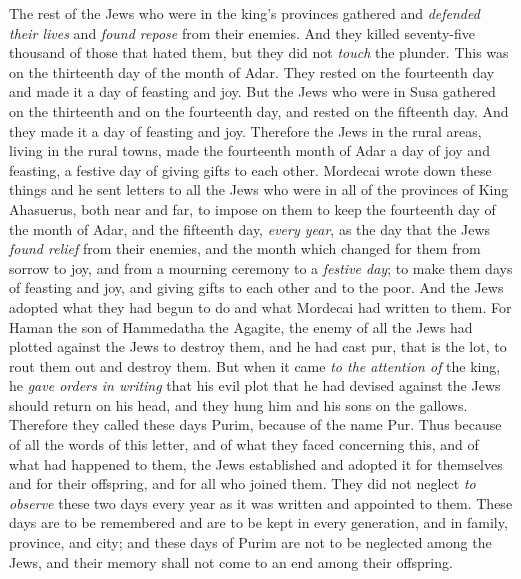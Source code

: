 \begin{biblechapter}
\verse The rest of the Jews who were in the king’s provinces gathered and \textit{defended their lives} and \textit{found repose} from their enemies. And they killed seventy-five thousand of those that hated them, but they did not \textit{touch} the plunder.
\verse This was on the thirteenth day of the month of Adar. They rested on the fourteenth day and made it a day of feasting and joy.
\verse But the Jews who were in Susa gathered on the thirteenth and on the fourteenth day, and rested on the fifteenth day. And they made it a day of feasting and joy.
\verse Therefore the Jews in the rural areas, living in the rural towns, made the fourteenth month of Adar a day of joy and feasting, a festive day of giving gifts to each other.
 Mordecai wrote down these things and he sent letters to all the Jews who were in all of the provinces of King Ahasuerus, both near and far,
\verse to impose on them to keep the fourteenth day of the month of Adar, and the fifteenth day, \textit{every year},
\verse as the day that the Jews \textit{found relief} from their enemies, and the month which changed for them from sorrow to joy, and from a mourning ceremony to a \textit{festive day}; to make them days of feasting and joy, and giving gifts to each other and to the poor.
\verse And the Jews adopted what they had begun to do and what Mordecai had written to them.
\verse For Haman the son of Hammedatha the Agagite, the enemy of all the Jews had plotted against the Jews to destroy them, and he had cast pur, that is the lot, to rout them out and destroy them.
\verse But when it came \textit{to the attention of} the king, he \textit{gave orders in writing} that his evil plot that he had devised against the Jews should return on his head, and they hung him and his sons on the gallows.
\verse Therefore they called these days Purim, because of the name Pur. Thus because of all the words of this letter, and of what they faced concerning this, and of what had happened to them,
\verse the Jews established and adopted it for themselves and for their offspring, and for all who joined them. They did not neglect \textit{to observe} these two days every year as it was written and appointed to them.
\verse These days are to be remembered and are to be kept in every generation, and in family, province, and city; and these days of Purim are not to be neglected among the Jews, and their memory shall not come to an end among their offspring.

\end{biblechapter}
